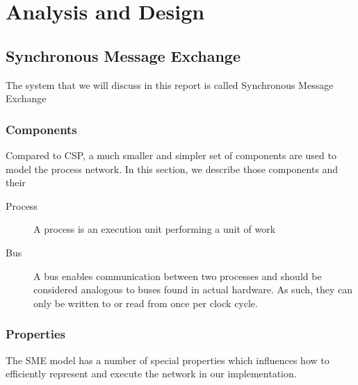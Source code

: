 \chapter{Analysis and Design}

\section{Synchronous Message Exchange}
The system that we will discuss in this report is called Synchronous Message Exchange

\subsection{Components}
Compared to CSP, a much smaller and simpler set of components are used
to model the process network. In this section, we describe those
components and their

\begin{description}
  \item[Process] A process is an execution unit performing a unit of
    work
  \item[Bus] A bus enables communication between two processes and
    should be considered analogous to buses found in actual
    hardware. As such, they can only be written to or read from once
    per clock cycle.
\end{description}

\subsection{Properties}
The SME model has a number of special properties which influences how
to efficiently represent and execute the network in our implementation.




